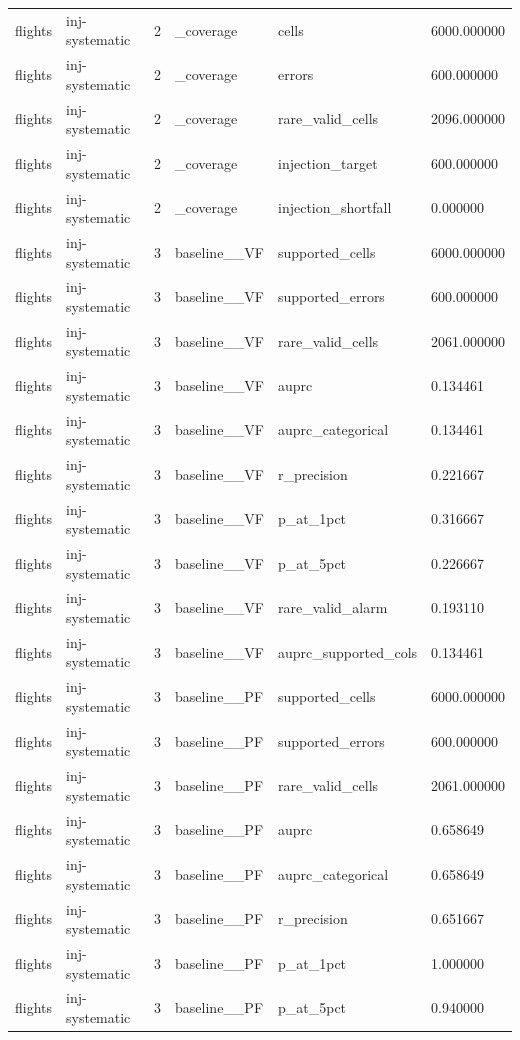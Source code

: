 \begin{tabular}{llllll}
flights & inj-systematic & 2 & \_coverage & cells & 6000.000000 \\
flights & inj-systematic & 2 & \_coverage & errors & 600.000000 \\
flights & inj-systematic & 2 & \_coverage & rare\_valid\_cells & 2096.000000 \\
flights & inj-systematic & 2 & \_coverage & injection\_target & 600.000000 \\
flights & inj-systematic & 2 & \_coverage & injection\_shortfall & 0.000000 \\
flights & inj-systematic & 3 & baseline\_\_VF & supported\_cells & 6000.000000 \\
flights & inj-systematic & 3 & baseline\_\_VF & supported\_errors & 600.000000 \\
flights & inj-systematic & 3 & baseline\_\_VF & rare\_valid\_cells & 2061.000000 \\
flights & inj-systematic & 3 & baseline\_\_VF & auprc & 0.134461 \\
flights & inj-systematic & 3 & baseline\_\_VF & auprc\_categorical & 0.134461 \\
flights & inj-systematic & 3 & baseline\_\_VF & r\_precision & 0.221667 \\
flights & inj-systematic & 3 & baseline\_\_VF & p\_at\_1pct & 0.316667 \\
flights & inj-systematic & 3 & baseline\_\_VF & p\_at\_5pct & 0.226667 \\
flights & inj-systematic & 3 & baseline\_\_VF & rare\_valid\_alarm & 0.193110 \\
flights & inj-systematic & 3 & baseline\_\_VF & auprc\_supported\_cols & 0.134461 \\
flights & inj-systematic & 3 & baseline\_\_PF & supported\_cells & 6000.000000 \\
flights & inj-systematic & 3 & baseline\_\_PF & supported\_errors & 600.000000 \\
flights & inj-systematic & 3 & baseline\_\_PF & rare\_valid\_cells & 2061.000000 \\
flights & inj-systematic & 3 & baseline\_\_PF & auprc & 0.658649 \\
flights & inj-systematic & 3 & baseline\_\_PF & auprc\_categorical & 0.658649 \\
flights & inj-systematic & 3 & baseline\_\_PF & r\_precision & 0.651667 \\
flights & inj-systematic & 3 & baseline\_\_PF & p\_at\_1pct & 1.000000 \\
flights & inj-systematic & 3 & baseline\_\_PF & p\_at\_5pct & 0.940000 \\

\end{tabular}
